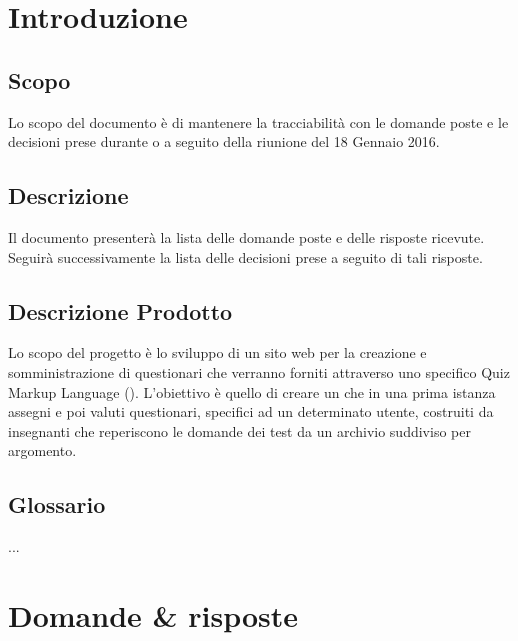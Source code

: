 \documentclass[12pt,a4paper]{article}
\newcommand{\dataCreazione}{18 Gennaio 2016}
\begin{document}
\tableofcontents
\listoftables
\newpage

\section{Introduzione}

\subsection{Scopo}
Lo scopo del documento è di mantenere la tracciabilità con le
domande poste e le decisioni prese durante o a seguito della riunione del \dataCreazione.

\subsection{Descrizione}
Il documento presenterà la lista delle domande poste e delle risposte ricevute.
Seguirà successivamente la lista delle decisioni prese a seguito di tali risposte.

\subsection{Descrizione Prodotto}
Lo scopo del progetto è lo sviluppo di un sito web per la creazione e somministrazione di questionari che verranno forniti attraverso uno specifico Quiz Markup Language (). L'obiettivo è quello di creare un  che in una prima istanza assegni e poi valuti questionari, specifici ad un determinato utente, costruiti da insegnanti che reperiscono le domande dei test da un archivio suddiviso per argomento.

\subsection{Glossario}
...

\newpage

\section{Domande \& risposte}
\end{document}
